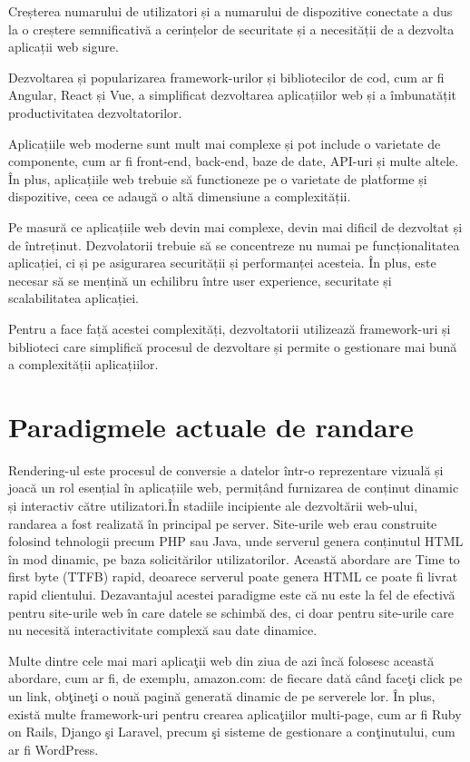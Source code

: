 \documentclass[12pt, a4paper]{report}
\begin{document}
Creșterea numarului de utilizatori și a numarului de dispozitive conectate a dus la o creștere semnificativă a cerințelor de securitate și a necesității de a dezvolta aplicații web sigure.

Dezvoltarea și popularizarea framework-urilor și bibliotecilor de cod, cum ar fi Angular, React și Vue, a simplificat dezvoltarea aplicațiilor web și a îmbunatățit productivitatea dezvoltatorilor.

Aplicațiile web moderne sunt mult mai complexe și pot include o varietate de componente, cum ar fi front-end, back-end, baze de date, API-uri și multe altele. În plus, aplicațiile web trebuie să functioneze pe o varietate de platforme și dispozitive, ceea ce adaugă o altă dimensiune a complexității.

Pe masură ce aplicațiile web devin mai complexe, devin mai dificil de dezvoltat și de întreținut. Dezvolatorii trebuie să se concentreze nu numai pe funcționalitatea aplicației, ci și pe asigurarea securității și performanței acesteia. În plus, este necesar să se mențină un echilibru între user experience, securitate și scalabilitatea aplicației.

Pentru a face față acestei complexități, dezvoltatorii utilizează framework-uri și biblioteci care simplifică procesul de dezvoltare și permite o gestionare mai bună a complexității aplicațiilor.


\chapter{Paradigmele actuale de randare}
Rendering-ul este procesul de conversie a datelor într-o reprezentare vizuală și joacă un rol esențial în aplicațiile web, permițând furnizarea de conținut dinamic și interactiv către utilizatori.În stadiile incipiente ale dezvoltării web-ului, randarea a fost realizată în principal pe server. Site-urile web erau construite folosind tehnologii precum PHP sau Java, unde serverul genera conținutul HTML în mod dinamic, pe baza solicitărilor utilizatorilor. Această abordare are Time to first byte (TTFB) rapid, deoarece serverul poate genera HTML ce poate fi livrat rapid clientului. Dezavantajul acestei paradigme este c\u a nu este la fel de efectivă pentru site-urile web \^ in care datele se schimb\u a des, ci doar pentru site-urile care nu necesit\u a interactivitate complexă sau date dinamice. \cite{benefitsserverrendering}

Multe dintre cele mai mari aplica\c tii web din ziua de azi \^ inc\u a folosesc aceast\u a abordare, cum ar fi, de exemplu, amazon.com: de fiecare dat\u a c\^ and face\c ti click pe un link, ob\c tine\c ti o nou\u a pagin\u a generat\u a dinamic de pe serverele lor. \^ In plus, exist\u a multe framework-uri pentru crearea  aplica\c tiilor multi-page, cum ar fi Ruby on Rails, Django \c si Laravel, precum \c si sisteme de gestionare a con\c tinutului, cum ar fi WordPress. 
\end{document}
